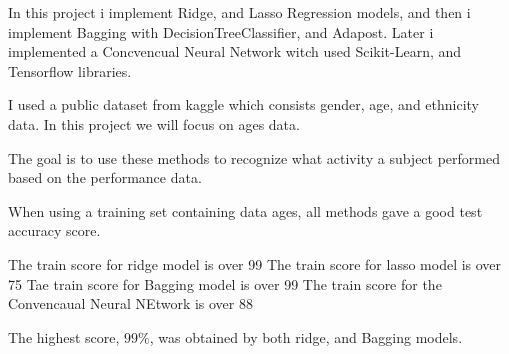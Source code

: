 \begin{Abstract}

In this project i implement Ridge, and Lasso Regression models, and then i implement Bagging with DecisionTreeClassifier, and Adapost. Later i implemented a Concvencual Neural Network witch used Scikit-Learn, and Tensorflow libraries.

I used a public dataset from kaggle which consists gender, age, and ethnicity data. In this project we will focus on ages data.

The goal is to use these methods to recognize what activity a subject performed based on the performance data. 

When using a training set containing data ages, all methods gave a good test accuracy score.

The train score for ridge model is over 99%
The train score for lasso model is over 75%
Tae train score for Bagging model is over 99%
The train score for the Convencaual Neural NEtwork is over 88%

The highest score, $99\%$, was obtained by both ridge, and  Bagging models.    
\end{Abstract}